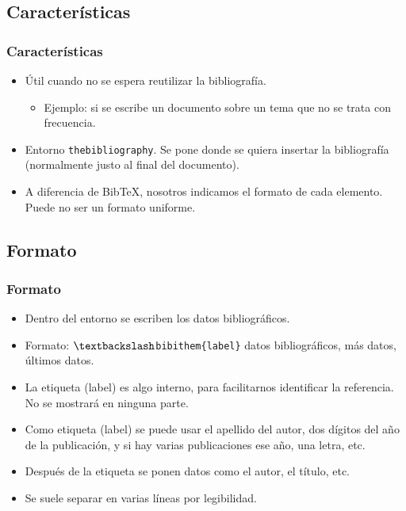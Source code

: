 \documentclass[aspectratio=43]{beamer}%
\begin{document}
\subsection{Características}
\begin{frame}[fragile]
\frametitle{\textbf{Características}}
\justifying
 \begin{itemize}\justifying
  \item Útil cuando no se espera reutilizar la bibliografía.
  \begin{itemize}\justifying
  \item[] Ejemplo: si se escribe un documento sobre un tema que no se trata con frecuencia.
\end{itemize}

  \item Entorno \texttt{thebibliography}. Se pone donde se quiera insertar la bibliografía (normalmente justo al final del documento).
  \item A diferencia de Bib\TeX{}, nosotros indicamos el formato de cada elemento. Puede no ser un formato uniforme.
\end{itemize}

\end{frame}

\subsection{Formato}
\begin{frame}[fragile]
\frametitle{\textbf{Formato}}
\justifying
 \begin{itemize}\justifying
  \item Dentro del entorno se escriben los datos bibliográficos.
  \item Formato: \texttt{$\textbackslash$bibithem\{label\}} datos bibliográficos, más datos, últimos datos.
  \item La etiqueta (label) es algo interno, para facilitarnos identificar la referencia. No se mostrará en ninguna parte.
  \item Como etiqueta (label) se puede usar el apellido del autor, dos dígitos del año de la publicación, y si hay varias publicaciones ese año, una letra, etc.
  \item Después de la etiqueta se ponen datos como el autor, el título, etc.
  \item Se suele separar en varias líneas por legibilidad.
\end{itemize}

\end{frame}
\end{document}
